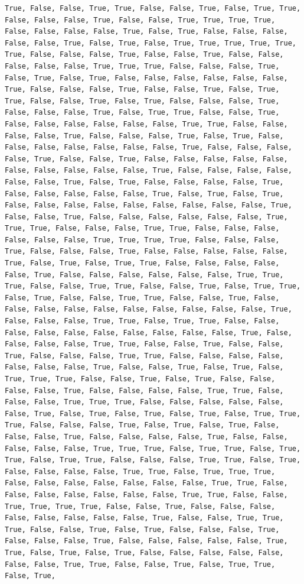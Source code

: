\documentclass[
  letterpaper,
  DIV=11,
  numbers=noendperiod]{scrartcl}
\begin{document}
\begin{verbatim}
True, False, False, True, True, False, False, True, False, True, True, False, False, False, True, False, False, True, True, True, True, False, False, False, False, True, False, True, False, False, False, False, False, True, False, True, False, True, True, True, True, True, True, False, False, False, True, False, False, True, False, False, False, False, False, True, True, True, False, False, False, True, False, True, False, True, False, False, False, False, False, False, True, False, False, False, True, False, False, True, False, True, True, False, False, True, False, True, False, False, False, True, False, False, False, True, False, True, True, False, False, True, False, False, False, False, False, False, True, True, False, False, False, False, True, False, False, False, True, False, True, False, False, False, False, False, False, False, True, False, False, False, False, True, False, False, True, False, False, False, False, False, False, False, False, False, False, True, False, False, False, False, False, False, True, False, True, False, False, False, False, True, False, False, False, False, False, True, False, True, False, True, False, False, False, False, False, False, False, False, False, True, False, False, True, False, False, False, False, False, False, True, True, True, False, False, False, True, True, False, False, False, False, False, False, True, True, True, True, False, False, False, True, False, False, False, True, False, False, False, False, False, True, False, True, False, True, True, False, False, False, False, False, True, False, False, False, False, False, False, True, True, True, False, False, True, True, False, False, True, False, True, True, False, True, False, False, True, True, False, False, True, False, False, False, False, False, False, False, False, False, False, True, False, False, False, True, True, False, True, True, False, False, False, False, False, False, False, False, False, False, True, False, False, False, False, True, True, False, False, True, False, False, True, False, False, False, True, True, False, False, False, False, False, False, False, True, False, False, True, False, True, False, True, True, True, False, False, True, False, True, False, False, False, False, True, False, False, False, False, True, True, False, False, False, True, True, True, False, False, False, False, False, False, True, False, True, False, True, False, True, False, True, True, True, False, False, False, True, False, True, False, True, False, False, False, True, False, False, False, False, True, False, False, False, False, False, True, True, True, False, True, True, False, True, True, False, True, True, False, False, False, True, True, False, True, False, False, False, False, True, True, False, True, True, True, False, False, False, False, False, False, False, True, True, False, False, False, False, False, False, False, True, True, False, False, True, True, True, True, False, False, True, False, False, False, False, False, False, False, False, True, False, False, True, True, True, False, False, True, False, True, False, False, False, True, False, False, False, True, False, False, False, False, False, True, True, False, True, False, True, False, False, False, False, False, False, False, True, True, False, False, True, False, True, True, False, True, 
\end{verbatim}
\end{document}
